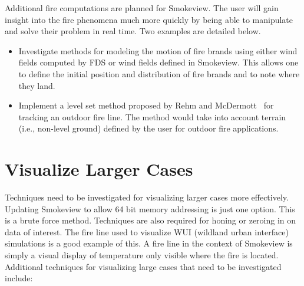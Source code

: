 \documentclass[11pt,twoside]{book}
\begin{document}
Additional fire computations are planned for Smokeview.  The user
will gain insight into the fire phenomena much more quickly by
being able to manipulate and solve their problem in real time. Two
examples are detailed below.

\begin{itemize}
\item  Investigate methods for modeling the motion of fire brands
using either wind fields computed by FDS or wind fields defined in
Smokeview. This allows one to define the initial position and
distribution of fire brands and to note where they land.

\item Implement a level set method proposed by Rehm and
McDermott~\cite{Rehm:LevelSet} for tracking an outdoor fire line.  The
method would take into account terrain (i.e., non-level
ground) defined by the user for outdoor fire applications.
\end{itemize}

%
%

\section{Visualize Larger Cases}
Techniques need to be investigated for visualizing larger cases
more effectively.  Updating Smokeview to allow 64 bit memory
addressing is just one option.  This is a brute force method.
Techniques are also required for honing or zeroing in on data of
interest.  The fire line used to visualize WUI (wildland urban
interface) simulations is a good example of this.  A fire line in
the context of Smokeview is simply a visual display of temperature
only visible where the fire is located.  Additional techniques for
visualizing large cases that need to be investigated include:
\end{document}
